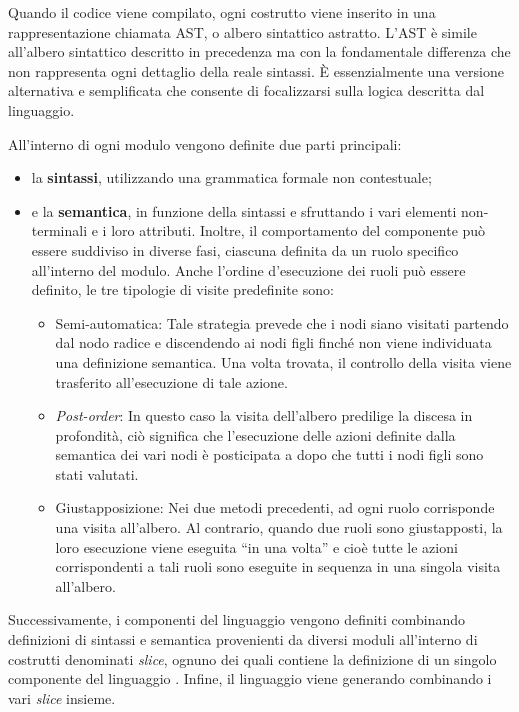 \documentclass[12pt,a4paper,openright,twoside]{book}
\begin{document}
Quando il codice viene compilato, ogni costrutto viene inserito in una rappresentazione chiamata \ac{AST}, o albero sintattico astratto. 
L'\ac{AST} è simile all'albero sintattico descritto in precedenza ma con la fondamentale differenza che non rappresenta ogni dettaglio della 
reale sintassi. È essenzialmente una versione alternativa e semplificata che consente di focalizzarsi sulla logica descritta dal linguaggio.

All’interno di ogni modulo vengono definite due parti principali:
\begin{itemize}
    \item la \textbf{sintassi}, utilizzando una grammatica formale non contestuale;
    \item e la \textbf{semantica}, in funzione della sintassi e sfruttando i vari elementi non-terminali e i loro attributi. Inoltre, il 
    comportamento del componente può essere suddiviso in diverse fasi, ciascuna definita da un ruolo specifico all'interno del modulo. Anche 
    l'ordine d'esecuzione dei ruoli può essere definito, le tre tipologie di visite predefinite sono:
    \begin{itemize}
        \item Semi-automatica: Tale strategia prevede che i nodi siano visitati partendo dal nodo radice e discendendo ai nodi figli finché non 
        viene individuata una definizione semantica. Una volta trovata, il controllo della visita viene trasferito all'esecuzione di tale azione.
        \item \textit{Post-order}: In questo caso la visita dell'albero predilige la discesa in profondità, ciò significa che l'esecuzione delle 
        azioni definite dalla semantica dei vari nodi è posticipata a dopo che tutti i nodi figli sono stati valutati.
        \item Giustapposizione: Nei due metodi precedenti, ad ogni ruolo corrisponde una visita all'albero. Al contrario, quando due ruoli sono 
        giustapposti, la loro esecuzione viene eseguita ``in una volta'' e cioè tutte le azioni corrispondenti a tali ruoli sono eseguite in 
        sequenza in una singola visita all'albero.
    \end{itemize}
\end{itemize}

Successivamente, i componenti del linguaggio vengono definiti combinando definizioni di sintassi e semantica provenienti da diversi moduli 
all’interno di costrutti denominati \textit{slice}, ognuno dei quali contiene la definizione di un singolo componente del linguaggio 
\cite{Vacchi2015}. Infine, il linguaggio viene generando combinando i vari \textit{slice} insieme. 
\end{document}
